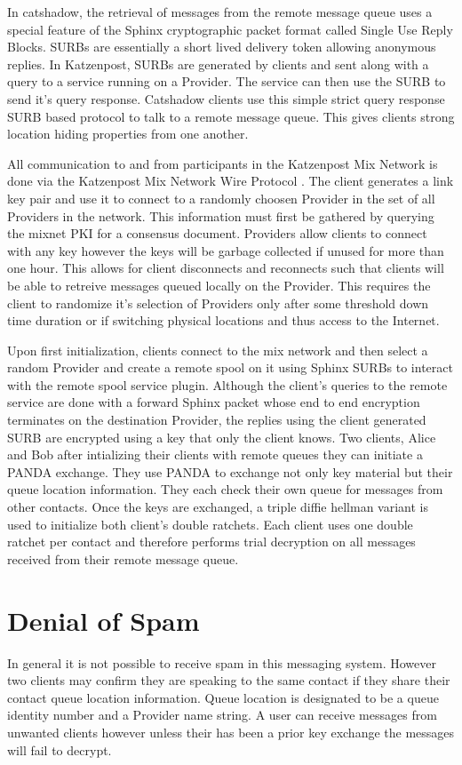 \documentclass[conference]{IEEEtran}
\begin{document}
In catshadow, the retrieval of messages from the remote message queue
uses a special feature of the Sphinx cryptographic packet format
called Single Use Reply Blocks. SURBs are essentially a short lived
delivery token allowing anonymous replies. In Katzenpost, SURBs are
generated by clients and sent along with a query to a service running
on a Provider. The service can then use the SURB to send it's query
response. Catshadow clients use this simple strict query response SURB
based protocol to talk to a remote message queue. This gives clients
strong location hiding properties from one another.

All communication to and from participants in the Katzenpost Mix
Network is done via the Katzenpost Mix Network Wire Protocol
\cite{KatzMixWire}. The client generates a link key pair and use it
to connect to a randomly choosen Provider in the set of all Providers
in the network. This information must first be gathered by querying
the mixnet PKI for a consensus document.  Providers allow clients to
connect with any key however the keys will be garbage collected if
unused for more than one hour. This allows for client disconnects and
reconnects such that clients will be able to retreive messages queued
locally on the Provider. This requires the client to randomize it's
selection of Providers only after some threshold down time duration or
if switching physical locations and thus access to the Internet.

Upon first initialization, clients connect to the mix network and then
select a random Provider and create a remote spool on it using Sphinx
SURBs to interact with the remote spool service plugin. Although the
client's queries to the remote service are done with a forward Sphinx
packet whose end to end encryption terminates on the destination
Provider, the replies using the client generated SURB are encrypted
using a key that only the client knows. Two clients, Alice and Bob
after intializing their clients with remote queues they can initiate
a PANDA exchange. They use PANDA to exchange not only key material but
their queue location information. They each check their own queue for
messages from other contacts. Once the keys are exchanged, a triple
diffie hellman variant is used to initialize both client's double
ratchets. Each client uses one double ratchet per contact and
therefore performs trial decryption on all messages received from
their remote message queue.

\section{Denial of Spam}
In general it is not possible to receive spam in this messaging system.
However two clients may confirm they are speaking to the same contact
if they share their contact queue location information. Queue location
is designated to be a queue identity number and a Provider name string.
A user can receive messages from unwanted clients however unless their
has been a prior key exchange the messages will fail to decrypt.
\end{document}
